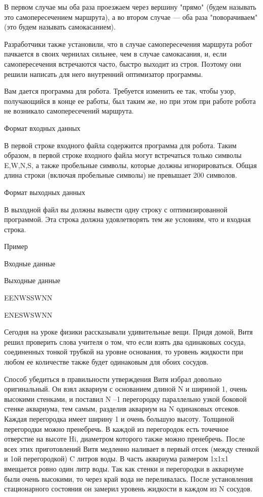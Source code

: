 \documentclass[]{article}
\begin{document}
В первом случае мы оба раза проезжаем через вершину "прямо" (будем называть это самопересечением маршрута), а во втором случае — оба раза "поворачиваем" (это будем называть самокасанием).

Разработчики также установили, что в случае самопересечения маршрута робот пачкается в своих чернилах сильнее, чем в случае самокасания, и, если самопересечения встречаются часто, быстро выходит из строя. Поэтому они решили написать для него внутренний оптимизатор программы.

Вам дается программа для робота. Требуется изменить ее так, чтобы узор, получающийся в конце ее работы, был таким же, но при этом при работе робота не возникало самопересечений маршрута.

Формат входных данных

В первой строке входного файла содержится программа для робота. Таким образом, в первой строке входного файла могут встречаться только символы E,W,N,S, а также пробельные символы, которые должны игнорироваться. Общая длина строки (включая пробельные символы) не превышает 200 символов.

Формат выходных данных

В выходной файл вы должны вывести одну строку с оптимизированной программой. Эта строка должна удовлетворять тем же условиям, что и входная строка.

Пример

Входные данные
	

Выходные данные

EENWSSWNN
	

ENESWSWNN


Сегодня на уроке физики рассказывали удивительные вещи. Придя домой, Витя решил проверить слова учителя о том, что если взять два одинаковых сосуда, соединенных тонкой трубкой на уровне основания, то уровень жидкости при любом ее количестве также будет одинаковым для обоих сосудов.

Способ убедиться в правильности утверждения Витя избрал довольно оригинальный. Он взял аквариум с основанием длиной N и шириной 1, очень высокими стенками, и поставил N –1 перегородку параллельно узкой боковой стенке аквариума, тем самым, разделив аквариум на N одинаковых отсеков. Каждая перегородка имеет ширину 1 и очень большую высоту. Толщиной перегородки можно пренебречь. В каждой из перегородок есть точечное отверстие на высоте Hi, диаметром которого также можно пренебречь. После всех этих приготовлений Витя медленно наливает в первый отсек (между стенкой и 1ой перегородкой) C литров воды. В часть аквариума размером 1x1x1 вмещается ровно один литр воды. Так как стенки и перегородки в аквариуме были очень высокими, то через край вода не переливалась. После установления стационарного состояния он замерил уровень жидкости в каждом из N сосудов.
\end{document}
